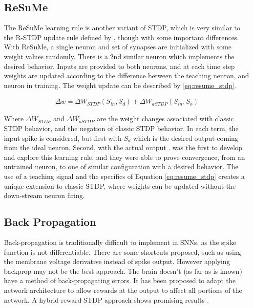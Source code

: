     \subsection{ReSuMe}
    The ReSuMe learning rule is another variant of STDP, which is very similar
    to the R-STDP update rule defined by \cite{mozafari_2018}, though with some
    important differences. With ReSuMe, a single neuron and set of synapses are
    initialized with some weight values randomly. There is a 2nd similar neuron
    which implements the desired behavior. Inputs are provided to both neurons,
    and at each time step weights are updated according to the difference
    between the teaching neuron, and neuron in training. The weight update can
    be described by \ref{eq:resume_stdp}.

    \begin{align}
      \Delta w = \Delta W_{STDP}(S_{in}, S_{d}) + \Delta W_{aSTDP}(S_{in}, S_{o}) \label{eq:resume_stdp}
    \end{align}

    Where $\Delta W_{STDP}$ and $\Delta W_{aSTDP}$ are the weight changes
    associated with classic STDP behavior, and the negation of classic STDP
    behavior. In each term, the input spike is considered, but first with
    $S_{d}$ which is the desired output coming from the ideal neuron. Second,
    with the actual output \cite{mozafari_2018}. \cite{ponulak_2010} was the
    first to develop and explore this learning rule, and they were able to prove
    convergence, from an untrained neuron, to one of similar configuration with
    a desired behavior. The use of a teaching signal and the specifics of
    Equation \ref{eq:resume_stdp} creates a unique extension to classic STDP,
    where weights can be updated without the down-stream neuron firing.

    
    \subsection{Back Propagation}
    
    Back-propagation is traditionally difficult to implement in SNNs, as the
    spike function is not differentiable. There are some shortcuts proposed,
    such as using the membrane voltage derivative instead of spike
    output. However applying backprop may not be the best approach. The brain
    doesn't (as far as is known) have a method of back-propagating errors. It
    has been proposed to adapt the network architecture to allow rewards at the
    output to affect all portions of the network. A hybrid reward-STDP approach
    shows promising results \cite{tavanaei_2019}.
    
